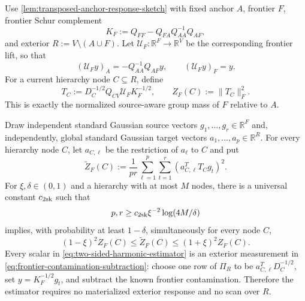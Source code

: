 \begin{lemma}
\label{lem:two-sided-harmonic-group-sketch}
Use \cref{lem:transposed-anchor-response-sketch} with fixed anchor $A$,
frontier $F$, frontier Schur complement
\begin{equation*}
 K_F:=Q_{FF}-Q_{FA}Q_{AA}^{-1}Q_{AF},
\end{equation*}
and exterior $R:=V\setminus(A\cup F)$.  Let
$\mathcal U_F:\mathbb R^F\to\mathbb R^V$ be the corresponding frontier lift,
so that
\begin{equation*}
 (\mathcal U_Fy)_A=-Q_{AA}^{-1}Q_{AF}y,
 \qquad
 (\mathcal U_Fy)_F=y.
\end{equation*}
For a current hierarchy node $C\subseteq R$, define
\begin{equation}
 T_C:=D_C^{-1/2}Q_{CV}\mathcal U_FK_F^{-1/2},
 \qquad
 Z_F(C):=\|T_C\|_F^2.
 \label{eq:two-sided-harmonic-response}
\end{equation}
This is exactly the normalized source-aware group mass of $F$ relative to
$A$.

Draw independent standard Gaussian source vectors
$g_1,\ldots,g_r\in\mathbb R^F$ and, independently, global standard Gaussian
target vectors $a_1,\ldots,a_p\in\mathbb R^R$.  For every hierarchy node
$C$, let $a_{C,\ell}$ be the restriction of $a_\ell$ to $C$ and put
\begin{equation}
 \widetilde Z_F(C)
 :=\frac1{pr}\sum_{\ell=1}^p\sum_{t=1}^r
 \left(a_{C,\ell}^TT_Cg_t\right)^2.
 \label{eq:two-sided-harmonic-estimator}
\end{equation}
For $\xi,\delta\in(0,1)$ and a hierarchy with at most $M$ nodes, there is a
universal constant $c_{\rm 2sk}$ such that
\begin{equation}
 p,r\geq c_{\rm 2sk}\xi^{-2}\log(4M/\delta)
 \label{eq:two-sided-harmonic-count}
\end{equation}
implies, with probability at least $1-\delta$, simultaneously for every node
$C$,
\begin{equation}
 (1-\xi)^2Z_F(C)
 \leq\widetilde Z_F(C)
 \leq(1+\xi)^2Z_F(C).
 \label{eq:two-sided-harmonic-guarantee}
\end{equation}
Every scalar in \cref{eq:two-sided-harmonic-estimator} is an exterior
measurement in \cref{eq:frontier-contamination-subtraction}: choose one row of
$\Pi_R$ to be $a_{C,\ell}^TD_C^{-1/2}$, set
$y=K_F^{-1/2}g_t$, and subtract the known frontier contamination.  Therefore
the estimator requires no materialized exterior response and no scan over
$R$.
\end{lemma}

